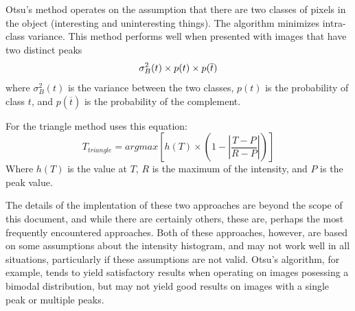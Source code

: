 \documentclass[letterpaper]{article}
\begin{document}
{{Otsu's method operates on the assumption that there are two classes of pixels in the object (interesting and uninteresting things). The algorithm minimizes intra-class variance. This method performs well when presented with images that have two distinct peaks
\begin{equation}
\sigma^2_B (t) \times p(t) \times p(\overline{t}) \\
\end{equation}
where $\sigma^2_B (t)$ is the variance between the two classes, $p(t)$ is the probability of class $t$, and $p(\overline{t})$ is the probability of the complement.

For the triangle method uses this equation:
\begin{equation}
T_{triangle} = argmax \left[ h(T) \times \left( 1 - \left| \frac{T - P}{R - P} \right| \right) \right]
\end{equation}
Where $h(T)$ is the value at $T$, $R$ is the maximum of the intensity, and $P$ is the peak value.

The details of the implentation of these two approaches are beyond the scope of this document, and while there are certainly others, these are, perhaps the most frequently encountered approaches. Both of these approaches, however, are based on some assumptions about the intensity histogram, and may not work well in all situations, particularly if these assumptions are not valid. Otsu's algorithm, for example, tends to yield satisfactory results when operating on images posessing a bimodal distribution, but may not yield good results on images with a single peak or multiple peaks.

}}
\end{document}

